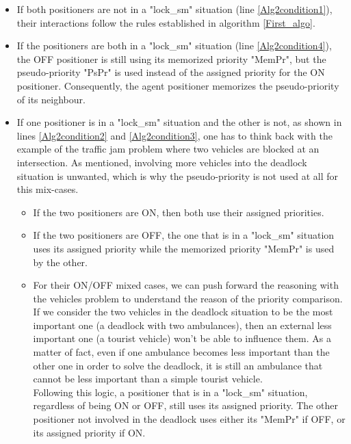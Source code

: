 \documentclass[]{spie}  %
\begin{document}
\begin{itemize}
\item If both positioners are not in a "lock\_sm" situation (line \ref{Alg2condition1}), their interactions follow the rules established in algorithm \ref{First_algo}.\\
\item If the positioners are both in a "lock\_sm" situation (line \ref{Alg2condition4}), the OFF positioner is still using its memorized priority "MemPr", but the pseudo-priority "PsPr" is used instead of the assigned priority for the ON positioner. Consequently, the agent positioner memorizes the pseudo-priority of its neighbour.\\
\item If one positioner is in a "lock\_sm" situation and the other is not, as shown in lines \ref{Alg2condition2} and \ref{Alg2condition3}, one has to think back with the example of the traffic jam problem where two vehicles are blocked at an intersection. As mentioned, involving more vehicles into the deadlock situation is unwanted, which is why the pseudo-priority is not used at all for this mix-cases.
\begin{itemize}
\item If the two positioners are ON, then both use their assigned priorities.\\
\item If the two positioners are OFF, the one that is in a "lock\_sm" situation uses its assigned priority while the memorized priority "MemPr" is used by the other.\\  
\item For their ON/OFF mixed cases, we can push forward the reasoning with the vehicles problem to understand the reason of the priority comparison.\\ 
If we consider the two vehicles in the deadlock situation to be the most important one (a deadlock with two ambulances), then an external less important one (a tourist vehicle) won't be able to influence them. As a matter of fact, even if one ambulance becomes less important than the other one in order to solve the deadlock, it is still an ambulance that cannot be less important than a simple tourist vehicle.\\
Following this logic, a positioner that is in a "lock\_sm" situation, regardless of being ON or OFF, still uses its assigned priority. The other positioner not involved in the deadlock uses either its "MemPr" if OFF, or its assigned priority if ON. 

\end{itemize}
\end{itemize}	
\end{document}
